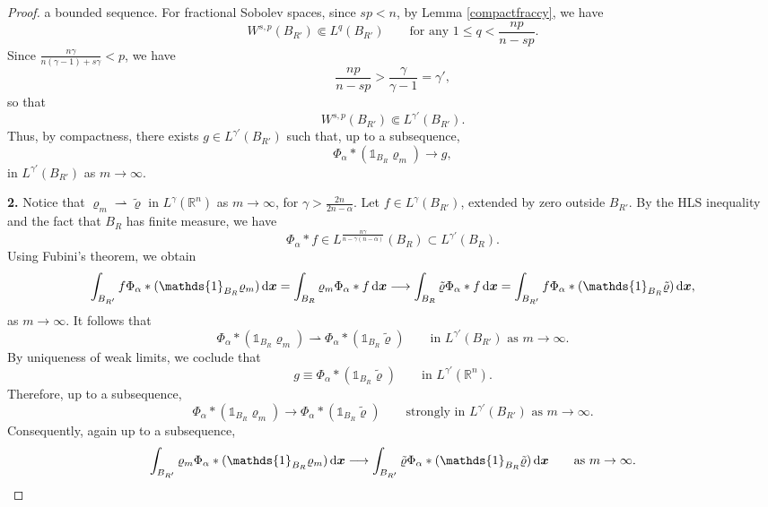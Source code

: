 \documentclass[reqno,11pt]{amsart}
\numberwithin{equation}{section}
\newcommand{\R}{\mathbb{R}}
\theoremstyle{definition}
\def\dd{{\, \rm d}}
\begin{document}
\begin{proof}
a bounded sequence. 
For fractional Sobolev spaces, since $sp < n$, by Lemma \ref{compactfraccy}, we have
 \[
  W^{s,p}(B_{R'}) \Subset L^q(B_{R'})\qquad \mbox{for any $1 \leq q < \frac{n p}{n - sp}$}. 
 \]
Since $\frac{n\gamma}{n(\gamma - 1) + s\gamma} < p$, we have
    \[
  \frac{n p}{n - sp} > \frac{\gamma}{\gamma - 1} = \gamma',
    \]
so that
    \begin{equation*}
  W^{s,p}(B_{R'}) \Subset L^{\gamma'}(B_{R'}).
    \end{equation*}
    Thus, by compactness, there exists $g \in L^{\gamma'}(B_{R'})$ such that, up to a subsequence,
    \[ \Phi_\alpha * (\mathds{1}_{B_R} \varrho_m ) \longrightarrow g,
    \]
    in $L^{\gamma'}(B_{R'})$ as $m \to \infty$.
    
\bigskip
\noindent
{\bf 2.}
Notice that $\varrho_m \rightharpoonup \tilde{\varrho}$ in $L^\gamma(\mathbb{R}^n)$
as $m \to \infty$, for $\gamma > \frac{2n}{2n - \alpha}$. 
Let $f \in L^{\gamma}(B_{R'})$, extended by zero outside $B_{R'}$.
By the HLS inequality and the fact that $B_R$ has finite measure, 
we have
$$
\Phi_\alpha * f \in L^\frac{n\gamma}{n - \gamma (n-\alpha)}(B_R) \subset L^{\gamma'}(B_R).
$$
Using Fubini's theorem, we obtain
    \[
 \int_{B_{R'}} f \Phi_\alpha * (\mathds{1}_{B_R}\varrho_m) \dd \boldsymbol{x} = \int_{B_{R}} \varrho_m  \Phi_\alpha * f \dd \boldsymbol{x} \longrightarrow \int_{B_{R}} \tilde{\varrho}  \Phi_\alpha * f \dd \boldsymbol{x} = \int_{B_{R'}} f \Phi_\alpha * (\mathds{1}_{B_R}\tilde{\varrho}) \dd \boldsymbol{x},
\]
as $m \to \infty$. 
It follows that
$$
\Phi_\alpha * (\mathds{1}_{B_R}\varrho_m) \rightharpoonup \Phi_\alpha * (\mathds{1}_{B_R}\tilde{\varrho})
\qquad \mbox{in $L^{\gamma'}(B_{R'})$  as $m \to \infty$.}
$$
By uniqueness of weak limits,  we coclude that
$$
g \equiv \Phi_\alpha * (\mathds{1}_{B_R}\tilde{\varrho}) \qquad\mbox{in $L^{\gamma'}(\R^n)$}.
$$
Therefore, up to a subsequence,
    \[
  \Phi_\alpha * (\mathds{1}_{B_R}\varrho_m) \longrightarrow \Phi_\alpha * (\mathds{1}_{B_R}\tilde{\varrho})\qquad\mbox{strongly in $L^{\gamma'}(B_{R'})$ as $m \to \infty$}.
    \]
Consequently, again up to a subsequence,
    \begin{equation}\label{localcon}
 \int_{B_{R'}} \varrho_m \Phi_\alpha * (\mathds{1}_{B_R}\varrho_m) \dd \boldsymbol{x} \longrightarrow \int_{B_{R'}} \tilde{\varrho} \Phi_\alpha * (\mathds{1}_{B_R}\tilde{\varrho}) \dd \boldsymbol{x}
 \qquad\mbox{as $m \to \infty$.}
    \end{equation}
  

\end{proof}
\end{document}
